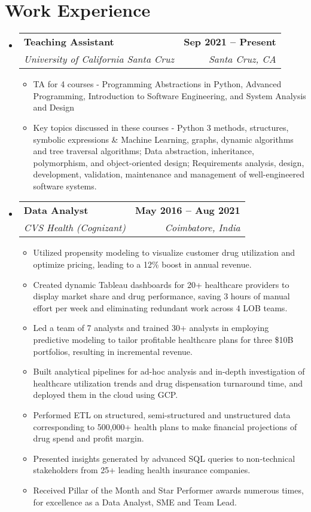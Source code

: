 \documentclass[letterpaper,10.5pt]{article}
\makeatletter
\newcommand{\resumeItem}[1]{
  \item\small{
    {#1 \vspace{-2pt}}
  }
}
\newcommand{\resumeSubheading}[4]{
  \vspace{-2pt}\item
    \begin{tabular*}{1.0\textwidth}[t]{l@{\extracolsep{\fill}}r}
      \textbf{#1} & \textbf{\small #2} \\
      \textit{\small#3} & \textit{\small #4} \\
    \end{tabular*}\vspace{-7pt}
}
\newcommand{\resumeSubHeadingListStart}{\begin{itemize}[leftmargin=0.0in, label={}]}
\newcommand{\resumeSubHeadingListEnd}{\end{itemize}}
\newcommand{\resumeItemListStart}{\begin{itemize}}
\newcommand{\resumeItemListEnd}{\end{itemize}\vspace{-5pt}}
\makeatother
\begin{document}
\section{Work Experience}
  \resumeSubHeadingListStart
  \resumeSubheading
      {Teaching Assistant}{Sep 2021 -- Present}
      {University of California Santa Cruz}{Santa Cruz, CA}
      \vspace{3pt}
      \resumeItemListStart[label={\tiny$\bullet$}]
        \resumeItem{TA for 4 courses - Programming Abstractions in Python, Advanced Programming, Introduction to Software Engineering, and System Analysis and Design}
        \resumeItem{Key topics discussed in these courses - Python 3 methods, structures, symbolic expressions \& Machine Learning, graphs, dynamic algorithms and tree traversal algorithms; Data abstraction, inheritance, polymorphism, and object-oriented design; Requirements analysis, design, development, validation, maintenance and management of well-engineered software systems.}
    \resumeItemListEnd
   \vspace{10pt} 
    \resumeSubheading
      {Data Analyst}{May 2016 -- Aug 2021}
      {CVS Health (Cognizant)}{Coimbatore, India}
      \vspace{3pt}
      \resumeItemListStart[label={\tiny$\bullet$}]
        \resumeItem{Utilized propensity modeling to visualize customer drug utilization and optimize pricing, leading to a 12\% boost in annual revenue.}
        \resumeItem{Created dynamic Tableau dashboards for 20+ healthcare providers to display market share and drug performance, saving 3 hours of manual effort per week and eliminating redundant work across 4 LOB teams.}
        \resumeItem{Led a team of 7 analysts and trained 30+ analysts in employing predictive modeling to tailor profitable healthcare plans for three \$10B portfolios, resulting in incremental revenue.}
        \resumeItem{Built analytical pipelines for ad-hoc analysis and in-depth investigation of healthcare utilization trends and drug dispensation turnaround time, and deployed them in the cloud using GCP.}
        \resumeItem{Performed ETL on structured, semi-structured and unstructured data corresponding to 500,000+ health plans to make financial projections of drug spend and profit margin.}
        \resumeItem{Presented insights generated by advanced SQL queries to non-technical stakeholders from 25+ leading health insurance companies.}
        \resumeItem{Received Pillar of the Month and Star Performer awards numerous times, for excellence as a Data Analyst, SME and Team Lead.}
      \resumeItemListEnd
  \resumeSubHeadingListEnd
\vspace{-7pt}
\end{document}
